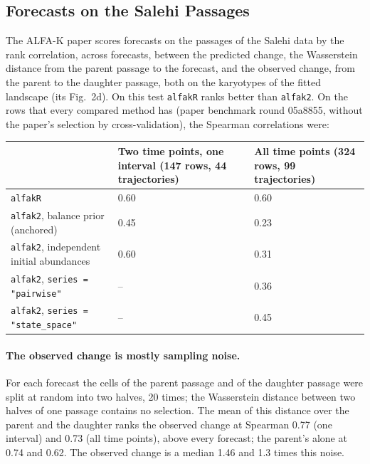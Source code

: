 \documentclass[11pt]{article}
\begin{document}
\subsection{Forecasts on the Salehi Passages}
\label{sec:salehi-noise}

The ALFA-K paper scores forecasts on the passages of the Salehi data by the
rank correlation, across forecasts, between the predicted change, the
Wasserstein distance from the parent passage to the forecast, and the observed
change, from the parent to the daughter passage, both on the karyotypes of the
fitted landscape (its Fig.~2d). On this test \texttt{alfakR} ranks better than
\texttt{alfak2}. On the rows that every compared method has (paper benchmark
round 05a8855, without the paper's selection by cross-validation), the
Spearman correlations were:

\begin{center}
\begin{tabular}{L{0.42\textwidth}L{0.22\textwidth}L{0.22\textwidth}}
\toprule
 & Two time points, one interval (147 rows, 44 trajectories) & All time points (324 rows, 99 trajectories) \\
\midrule
\texttt{alfakR} & 0.60 & 0.60 \\
\texttt{alfak2}, balance prior (anchored) & 0.45 & 0.23 \\
\texttt{alfak2}, independent initial abundances & 0.60 & 0.31 \\
\texttt{alfak2}, \texttt{series = "pairwise"} & -- & 0.36 \\
\texttt{alfak2}, \texttt{series = "state\_space"} & -- & 0.45 \\
\bottomrule
\end{tabular}
\end{center}

\paragraph{The observed change is mostly sampling noise.} For each forecast
the cells of the parent passage and of the daughter passage were split at
random into two halves, 20 times; the Wasserstein distance between two halves
of one passage contains no selection. The mean of this distance over the parent
and the daughter ranks the observed change at Spearman 0.77 (one interval) and
0.73 (all time points), above every forecast; the parent's alone at 0.74 and
0.62. The observed change is a median 1.46 and 1.3 times this noise.
\end{document}
